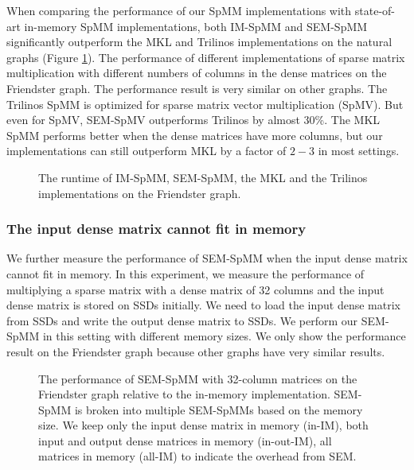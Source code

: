 When comparing the performance of our SpMM implementations with state-of-art
in-memory SpMM implementations, both IM-SpMM and SEM-SpMM significantly
outperform the MKL and Trilinos implementations on the natural graphs (Figure
\ref{perf:spmm}). The performance of different implementations
of sparse matrix multiplication with different numbers of columns in the dense
matrices on the Friendster graph. The performance result is very similar
on other graphs. The Trilinos SpMM is optimized for sparse matrix vector
multiplication (SpMV). But even for SpMV, SEM-SpMV outperforms Trilinos by
almost 30\%. The MKL SpMM performs better when the dense matrices have more columns,
but our implementations can still outperform MKL by a factor of $2-3$ in most
settings.

\begin{figure}
	\begin{center}
		\footnotesize
		
		\caption{The runtime of IM-SpMM, SEM-SpMM, the MKL and the Trilinos
			implementations on the Friendster graph.}
		\label{perf:spmm}
	\end{center}
\end{figure}

\subsubsection{The input dense matrix cannot fit in memory}

We further measure the performance of SEM-SpMM when the input dense matrix
cannot fit in memory. In this experiment, we
measure the performance of multiplying a sparse matrix with a dense matrix
of 32 columns and the input dense matrix is stored on SSDs initially.
We need to load the input dense matrix from SSDs and write the output dense
matrix to SSDs. We perform our SEM-SpMM in this setting with different memory
sizes. We only show the performance result on the Friendster graph because
other graphs have very similar results.

\begin{figure}
	\begin{center}
		\footnotesize
		
		\caption{The performance of SEM-SpMM with 32-column matrices on
			the Friendster graph relative to the in-memory implementation.
			SEM-SpMM is broken into multiple SEM-SpMMs based on the memory
			size. We keep only the input dense matrix in memory (in-IM),
			both input and output dense matrices in memory (in-out-IM),
			all matrices in memory (all-IM) to indicate the overhead from SEM.}
		\label{perf:spmm32}
	\end{center}
\end{figure}

